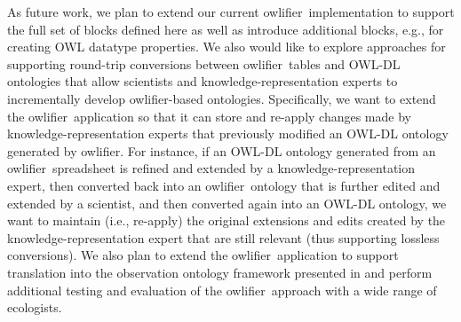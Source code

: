 \documentclass[5p,authoryear]{elsarticle}
\newcommand{\owlifier}{\textsf{owlifier}}
\begin{document}
As future work, we plan to extend our current
\owlifier\ implementation to support the full set of blocks defined
here as well as introduce additional blocks, e.g., for creating OWL
datatype properties. We also would like to explore approaches for
supporting round-trip conversions between \owlifier\ tables and OWL-DL
ontologies that allow scientists and knowledge-representation experts
to incrementally develop \owlifier-based ontologies.  Specifically, we
want to extend the \owlifier\ application so that it can store and
re-apply changes made by knowledge-representation experts that
previously modified an OWL-DL ontology generated by \owlifier. For
instance, if an OWL-DL ontology generated from an
\owlifier\ spreadsheet is refined and extended by a
knowledge-representation expert, then converted back into an
\owlifier\ ontology that is further edited and extended by a
scientist, and then converted again into an OWL-DL ontology, we want
to maintain (i.e., re-apply) the original extensions and edits created
by the knowledge-representation expert that are still relevant (thus
supporting lossless conversions).  We also plan to extend the
\owlifier\ application to support translation into the observation
ontology framework presented in
\citep{bowers08:_concep_model_framew_for_expres} and perform
additional testing and evaluation of the \owlifier\ approach with a
wide range of ecologists.

%
 

\end{document}
